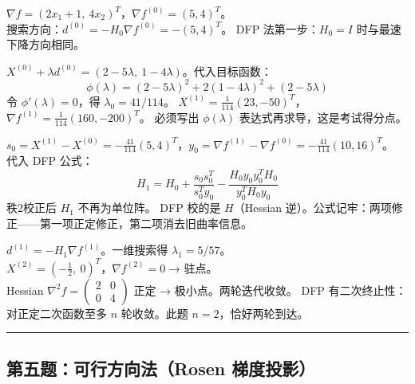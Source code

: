   {$\nabla f = (2x_1+1,\ 4x_2)^T$，$\nabla f^{(0)} = (5, 4)^T$。\\
  搜索方向：$d^{(0)} = -H_0 \nabla f^{(0)} = -(5, 4)^T$。}
  {DFP 法第一步：$H_0=I$ 时与最速下降方向相同。}
  {\par\vspace{4pt}}
  {$X^{(0)} + \lambda d^{(0)} = (2-5\lambda,\ 1-4\lambda)$。代入目标函数：
  \[
  \phi(\lambda) = (2-5\lambda)^2 + 2(1-4\lambda)^2 + (2-5\lambda)
  \]
  令 $\phi'(\lambda)=0$，得 $\lambda_0 = 41/114$。
  $X^{(1)} = \frac{1}{114}(23, -50)^T$，
  $\nabla f^{(1)} = \frac{1}{114}(160, -200)^T$。}
  {必须写出 $\phi(\lambda)$ 表达式再求导，这是考试得分点。}
  {\par\vspace{4pt}}
  {$s_0 = X^{(1)}-X^{(0)} = -\frac{41}{114}(5,4)^T$，$y_0 = \nabla f^{(1)}-\nabla f^{(0)} = -\frac{41}{114}(10,16)^T$。\\
  代入 DFP 公式：
  \[
  H_1 = H_0 + \frac{s_0 s_0^T}{s_0^T y_0} - \frac{H_0 y_0 y_0^T H_0}{y_0^T H_0 y_0}
  \]
  秩2校正后 $H_1$ 不再为单位阵。}
  {DFP 校的是 $H$（Hessian 逆）。公式记牢：两项修正——第一项正定修正，第二项消去旧曲率信息。}
  {\par\vspace{4pt}}
  {$d^{(1)} = -H_1 \nabla f^{(1)}$。一维搜索得 $\lambda_1 = 5/57$。\\
  $X^{(2)} = (-\frac{1}{2},\ 0)^T$，$\nabla f^{(2)} = 0$ → 驻点。\\
  Hessian $\nabla^2 f = \begin{pmatrix}2&0\\0&4\end{pmatrix}$ 正定 → 极小点。两轮迭代收敛。}
  {DFP 有二次终止性：对正定二次函数至多 $n$ 轮收敛。此题 $n=2$，恰好两轮到达。}
  {\par\vspace{4pt}}\rule{\textwidth}{0.4pt}

\subsection*{第五题：可行方向法（Rosen 梯度投影）}

